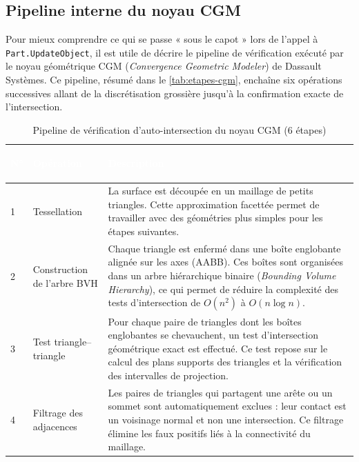 \subsection{Pipeline interne du noyau CGM}

Pour mieux comprendre ce qui se passe « sous le capot » lors de l'appel à \texttt{Part.UpdateObject}, il est utile de décrire le pipeline de vérification exécuté par le noyau géométrique CGM (\textit{Convergence Geometric Modeler}) de Dassault Systèmes. Ce pipeline, résumé dans le \autoref{tab:etapes-cgm}, enchaîne six opérations successives allant de la discrétisation grossière jusqu'à la confirmation exacte de l'intersection.

\begin{table}[H]
    \centering
    \caption{Pipeline de vérification d'auto-intersection du noyau CGM (6 étapes)}
    \label{tab:etapes-cgm}
    \begin{tabularx}{\textwidth}{|>{\centering\arraybackslash}p{0.8cm}|>{\bfseries\raggedright\arraybackslash}p{3.2cm}|X|}
        \hline
        \rowcolor{headerblue}
        \textcolor{white}{\textbf{N°}} & \textcolor{white}{\textbf{Opération}} & \centering\textcolor{white}{\textbf{Description}} \tabularnewline
        \hline
        \rowcolor{rowlight}
        1 & Tessellation & La surface est découpée en un maillage de petits triangles. Cette approximation facettée permet de travailler avec des géométries plus simples pour les étapes suivantes. \\
        \hline
        \rowcolor{rowwhite}
        2 & Construction de l'arbre BVH & Chaque triangle est enfermé dans une boîte englobante alignée sur les axes (AABB). Ces boîtes sont organisées dans un arbre hiérarchique binaire (\textit{Bounding Volume Hierarchy}), ce qui permet de réduire la complexité des tests d'intersection de $O(n^2)$ à $O(n \log n)$. \\
        \hline
        \rowcolor{rowlight}
        3 & Test triangle--triangle & Pour chaque paire de triangles dont les boîtes englobantes se chevauchent, un test d'intersection géométrique exact est effectué. Ce test repose sur le calcul des plans supports des triangles et la vérification des intervalles de projection. \\
        \hline
        \rowcolor{rowwhite}
        4 & Filtrage des adjacences & Les paires de triangles qui partagent une arête ou un sommet sont automatiquement exclues : leur contact est un voisinage normal et non une intersection. Ce filtrage élimine les faux positifs liés à la connectivité du maillage. \\

\end{tabularx}
\end{table}
